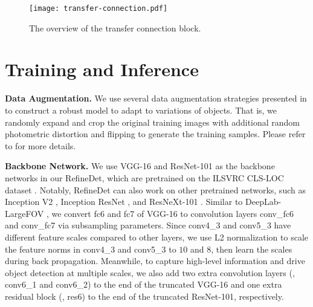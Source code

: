 \documentclass[10pt,twocolumn,letterpaper]{article}
\begin{document}
\begin{figure}
\centering
\texttt{[image: transfer-connection.pdf]}
\vspace{-2mm}
\caption{The overview of the transfer connection block.}
\label{fig:transfer-connection-block}
\end{figure}


\section{Training and Inference}

{\noindent \textbf{Data Augmentation.}}
We use several data augmentation strategies presented in \cite{DBLP:conf/eccv/LiuAESRFB16} to construct a robust model to adapt to variations of objects. That is, we randomly expand and crop the original training images with additional random photometric distortion \cite{DBLP:journals/corr/Howard13} and flipping to generate the training samples. Please refer to \cite{DBLP:conf/eccv/LiuAESRFB16} for more details.

{\noindent \textbf{Backbone Network.}}
We use VGG-16 \cite{DBLP:journals/corr/SimonyanZ14a} and ResNet-101 \cite{DBLP:conf/cvpr/HeZRS16} as the backbone networks in our RefineDet, which are pretrained on the ILSVRC CLS-LOC dataset \cite{DBLP:journals/ijcv/RussakovskyDSKS15}. Notably, RefineDet can also work on other pretrained networks, such as Inception V2 \cite{DBLP:conf/icml/IoffeS15}, Inception ResNet \cite{DBLP:conf/aaai/SzegedyIVA17}, and ResNeXt-101 \cite{DBLP:journals/corr/XieGDTH16}. Similar to DeepLab-LargeFOV \cite{DBLP:conf/iclr/ChenPKMY14}, we convert fc6 and fc7 of VGG-16 to convolution layers conv\_fc6 and conv\_fc7 via subsampling parameters. Since conv4\_3 and conv5\_3 have different feature scales compared to other layers, we use L2 normalization \cite{DBLP:conf/iclrw/LiuRB15} to scale the feature norms in conv4\_3 and conv5\_3 to $10$ and $8$, then learn the scales during back propagation. Meanwhile, to capture high-level information and drive object detection at multiple scales, we also add two extra convolution layers (\ie, conv6\_1 and conv6\_2) to the end of the truncated VGG-16 and one extra residual block (\ie, res6) to the end of the truncated ResNet-101, respectively.
\end{document}
